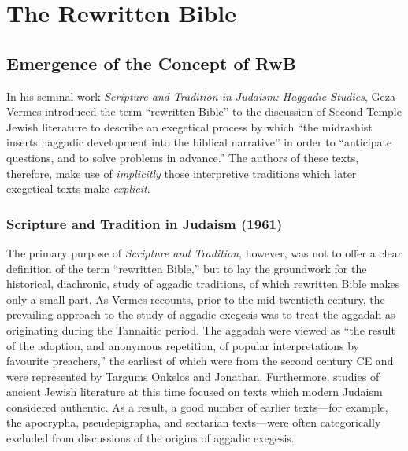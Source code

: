 \chapter{The Rewritten Bible}\label{the-rewritten-bible}

\section{Emergence of the Concept of
RwB}\label{emergence-of-the-concept-of-rwb}

In his seminal work
\emph{Scripture and Tradition in Judaism: Haggadic Studies}, Geza Vermes
introduced the term ``rewritten Bible'' to the discussion of Second
Temple Jewish literature to describe an exegetical process by which
``the midrashist inserts haggadic development into the biblical
narrative'' in order to ``anticipate questions, and to solve problems in
advance.''\autocite[95]{vermes1961} The authors of these texts,
therefore, make use of \emph{implicitly} those interpretive traditions
which later exegetical texts make \emph{explicit}.

\subsection{Scripture and Tradition in Judaism
(1961)}\label{scripture-and-tradition-in-judaism-1961}

The primary purpose of \emph{Scripture and Tradition}, however, was not
to offer a clear definition of the term ``rewritten Bible,'' but to lay
the groundwork for the historical, diachronic, study of aggadic
traditions, of which rewritten Bible makes only a small part. As Vermes
recounts, prior to the mid-twentieth century, the prevailing approach to
the study of aggadic exegesis was to treat the aggadah as originating
during the Tannaitic period. The aggadah were viewed as ``the result of
the adoption, and anonymous repetition, of popular interpretations by
favourite preachers,'' \autocite[3]{vermes1961} the earliest of which
were from the second century CE and were represented by Targums Onkelos
and Jonathan. Furthermore, studies of ancient Jewish literature at this
time focused on texts which modern Judaism considered authentic. As a
result, a good number of earlier texts---for example, the apocrypha,
pseudepigrapha, and sectarian texts---were often categorically excluded
from discussions of the origins of aggadic
exegesis.\autocite[2]{vermes1961}


